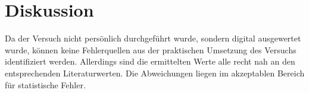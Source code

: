 \section{Diskussion}
\label{sec:Diskussion}
Da der Versuch nicht persönlich durchgeführt wurde, sondern digital ausgewertet wurde, können keine Fehlerquellen aus der praktischen Umsetzung des Versuchs identifiziert werden. Allerdings sind die ermittelten Werte alle recht nah an den entsprechenden Literaturwerten. Die Abweichungen liegen im akzeptablen Bereich für statistische Fehler.